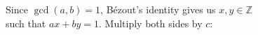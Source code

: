 \documentclass[preview]{standalone}
\begin{document}
\begin{center}
Since $\gcd(a, b) = 1$, Bézout's identity gives us $x, y \in \mathbb{Z}$ \\such that $ax + by = 1$. Multiply both sides by $c$:
\end{center}
\end{document}
